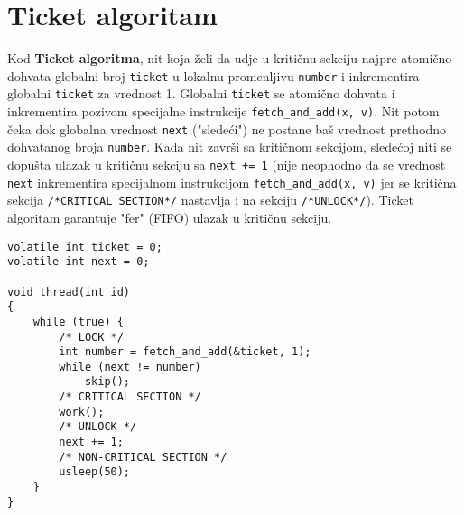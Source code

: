 \clearpage
\section{Ticket algoritam}
Kod \textbf{Ticket algoritma}, nit koja \v{z}eli da udje u kriti\v{c}nu sekciju najpre atomi\v{c}no dohvata globalni broj \texttt{ticket} u lokalnu promenljivu \texttt{number} i inkrementira globalni \texttt{ticket} za vrednost 1. Globalni \texttt{ticket} se atomi\v{c}no dohvata i inkrementira pozivom specijalne instrukcije \texttt{fetch\_and\_add(x, v)}. Nit potom \v{c}eka dok globalna vrednost \texttt{next} ("slede\'{c}i") ne postane ba\v{s} vrednost prethodno dohvatanog broja \texttt{number}. Kada nit zavr\v{s}i sa kriti\v{c}nom sekcijom, slede\'{c}oj niti se dopu\v{s}ta ulazak u kriti\v{c}nu sekciju sa \texttt{next += 1} (nije neophodno da se vrednost \texttt{next} inkrementira specijalnom instrukcijom \texttt{fetch\_and\_add(x, v)} jer se kriti\v{c}na sekcija \texttt{/*CRITICAL SECTION*/} nastavlja i na sekciju \texttt{/*UNLOCK*/}).  Ticket algoritam garantuje "fer" (FIFO) ulazak u kriti\v{c}nu sekciju.
\begin{lstlisting}
volatile int ticket = 0;
volatile int next = 0;

void thread(int id)
{
    while (true) {
		/* LOCK */
        int number = fetch_and_add(&ticket, 1);
        while (next != number)
            skip();
		/* CRITICAL SECTION */
		work();
		/* UNLOCK */
		next += 1;
		/* NON-CRITICAL SECTION */
        usleep(50);
    }
}
\end{lstlisting}